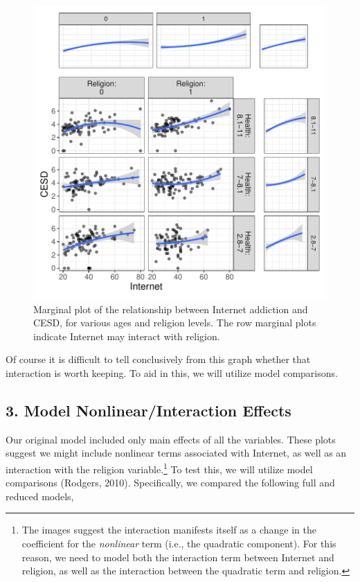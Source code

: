 \documentclass[
  man,floatsintext]{apa6}
\begin{document}
\begin{figure}

{\centering \includegraphics[width=0.75\linewidth]{visual_partitions_files/figure-latex/applied2-1} 

}

\caption{Marginal plot of the relationship between Internet addiction and CESD, for various ages and religion levels. The row marginal plots indicate Internet may interact with religion.}\label{fig:applied2}
\end{figure}

Of course it is difficult to tell conclusively from this graph whether that interaction is worth keeping. To aid in this, we will utilize model comparisons.

\subsection{3. Model Nonlinear/Interaction Effects}\label{model-nonlinearinteraction-effects-1}

Our original model included only main effects of all the variables. These plots suggest we might include nonlinear terms associated with Internet, as well as an interaction with the religion variable.\footnote{The images suggest the interaction manifests itself as a change in the coefficient for the \emph{nonlinear} term (i.e., the quadratic component). For this reason, we need to model both the interaction term between Internet and religion, as well as the interaction between the quadratic term and religion.} To test this, we will utilize model comparisons (Rodgers, 2010). Specifically, we compared the following full and reduced models,
\end{document}
